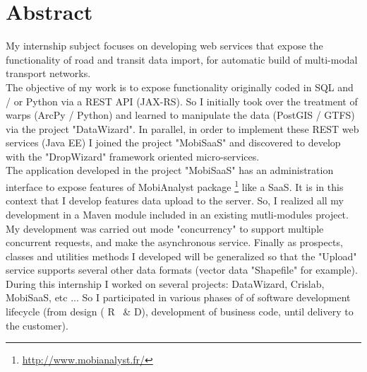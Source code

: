 \chapter*{Abstract}


My internship subject focuses on developing web services that expose the functionality of road and transit data import, for automatic build of multi-modal transport networks. \\

The objective of my work is to expose functionality originally coded in SQL and / or Python via a REST API (JAX-RS). So I initially took over the treatment of warps (ArcPy / Python) and learned to manipulate the data (PostGIS / GTFS) via the project "DataWizard". In parallel, in order to implement these REST web services (Java EE) I joined the project "MobiSaaS" and discovered to develop with the "DropWizard" framework oriented micro-services. \\

The application developed in the project "MobiSaaS" has an administration interface to expose features of MobiAnalyst package \footnote{\url{http://www.mobianalyst.fr/}} like a SaaS. It is in this context that I develop features data upload to the server. So, I realized all my development in a Maven module included in an existing mutli-modules project. My development was carried out mode "concurrency" to support multiple concurrent requests, and make the asynchronous service. Finally as prospects, classes and utilities methods I developed will be generalized so that the "Upload" service supports several other data formats (vector data "Shapefile" for example). \\

During this internship I worked on several projects: DataWizard, Crislab, MobiSaaS, etc ... So I participated in various phases of of software development lifecycle (from design ( R \ & D), development of business code, until delivery to the customer). \\

